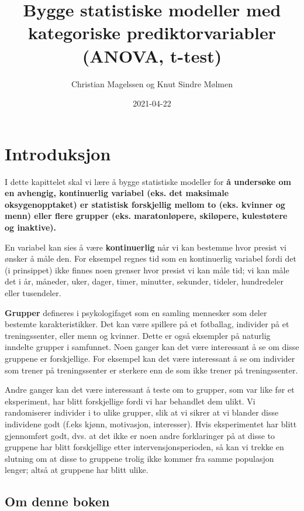 \documentclass[
]{book}
\title{Bygge statistiske modeller med kategoriske prediktorvariabler (ANOVA, t-test)}
\author{Christian Magelssen og Knut Sindre Mølmen}
\date{2021-04-22}
\begin{document}
\maketitle

{
\setcounter{tocdepth}{1}
\tableofcontents
}
\hypertarget{intro}{%
\chapter{Introduksjon}\label{intro}}

I dette kapittelet skal vi lære å bygge statistiske modeller for \textbf{å undersøke om en avhengig, kontinuerlig variabel (eks. det maksimale oksygenopptaket) er statistisk forskjellig mellom to (eks. kvinner og menn) eller flere grupper (eks. maratonløpere, skiløpere, kulestøtere og inaktive).}

En variabel kan sies å være \textbf{kontinuerlig} når vi kan bestemme hvor presist vi ønsker å måle den. For eksempel regnes tid som en kontinuerlig variabel fordi det (i prinsippet) ikke finnes noen grenser hvor presist vi kan måle tid; vi kan måle det i år, måneder, uker, dager, timer, minutter, sekunder, tideler, hundredeler eller tusendeler.

\textbf{Grupper} defineres i psykologifaget som en samling mennesker som deler bestemte karakteristikker. Det kan være spillere på et fotballag, individer på et treningssenter, eller menn og kvinner. Dette er også eksempler på naturlig inndelte grupper i samfunnet. Noen ganger kan det være interessant å se om disse gruppene er forskjellige. For eksempel kan det være interessant å se om individer som trener på treningssenter er sterkere enn de som ikke trener på treningssenter.

Andre ganger kan det være interessant å teste om to grupper, som var like før et eksperiment, har blitt forskjellige fordi vi har behandlet dem ulikt. Vi randomiserer individer i to ulike grupper, slik at vi sikrer at vi blander disse individene godt (f.eks kjønn, motivasjon, interesser). Hvis eksperimentet har blitt gjennomført godt, dvs. at det ikke er noen andre forklaringer på at disse to gruppene har blitt forskjellige etter intervensjonsperioden, så kan vi trekke en slutning om at disse to gruppene trolig ikke kommer fra samme populasjon lenger; altså at gruppene har blitt ulike.

\hypertarget{om-denne-boken}{%
\section{Om denne boken}\label{om-denne-boken}}
\end{document}
